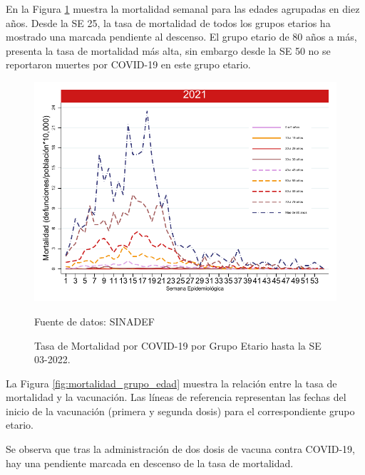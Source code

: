 \documentclass[12pt,a4paper,openany]{book}
\begin{document}
	\noindent En la Figura \ref{fig:mortalidad_edad} muestra la mortalidad semanal para las edades agrupadas en diez años. Desde la SE 25, la tasa de mortalidad de todos los grupos etarios ha mostrado una marcada pendiente al descenso. El grupo etario de 80 años a más, presenta la tasa de mortalidad más alta, sin embargo desde la SE 50 no se reportaron muertes por COVID-19 en este grupo etario. 	
	\begin{figure}[h]
	\caption{Tasa de Mortalidad por COVID-19 por Grupo Etario hasta la SE 03-2022.}\label{fig:mortalidad_edad}
	\begin{center}
		\includegraphics[width=0.65\linewidth]{../figuras/mortalidad_edad.pdf}
	\end{center}
	{\footnotesize Fuente de datos: SINADEF} 
	\end{figure}


	La Figura \ref{fig:mortalidad_grupo_edad} muestra la relación entre la tasa de mortalidad y la vacunación. Las líneas de referencia representan las fechas del inicio de la vacunación (primera y segunda dosis) para el correspondiente grupo etario. 
	
	Se observa que tras la administración de dos dosis de vacuna contra COVID-19,  hay una pendiente marcada en descenso de la tasa de mortalidad. 
\end{document}
